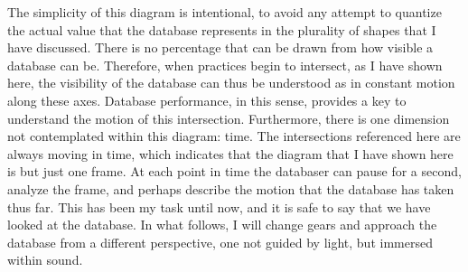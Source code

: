 The simplicity of this diagram is intentional, to avoid any attempt to quantize the actual value that the database represents in the plurality of shapes that I have discussed. There is no percentage that can be drawn from how visible a database can be. Therefore, when practices begin to intersect, as I have shown here, the visibility of the database can thus be understood as in constant motion along these axes. Database performance, in this sense, provides a key to understand the motion of this intersection. Furthermore, there is one dimension not contemplated within this diagram: time. The intersections referenced here are always moving in time, which indicates that the diagram that I have shown here is but just one frame. At each point in time the databaser can pause for a second, analyze the frame, and perhaps describe the motion that the database has taken thus far. This has been my task until now, and it is safe to say that we have looked at the database. In what follows, I will change gears and approach the database from a different perspective, one not guided by light, but immersed within sound.
